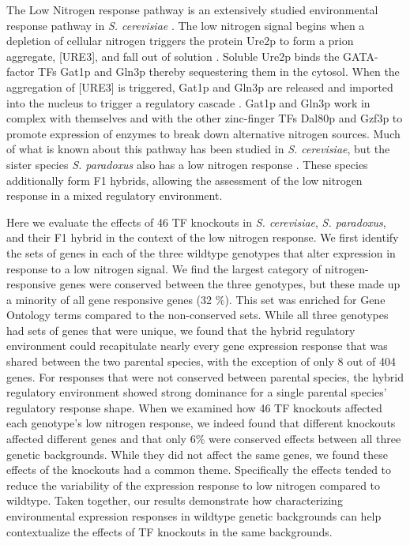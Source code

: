 The Low Nitrogen response pathway is an extensively studied environmental response pathway in \textit{S. cerevisiae} \cite{Magasanik2005}. The low nitrogen signal begins when a depletion of cellular nitrogen triggers the protein Ure2p to form a prion aggregate, [URE3], and fall out of solution \cite{Wickner1994}. Soluble Ure2p binds the GATA-factor TFs Gat1p and Gln3p thereby sequestering them in the cytosol. When the aggregation of [URE3] is triggered, Gat1p and Gln3p are released and imported into the nucleus to trigger a regulatory cascade \cite{Zhang2018}. Gat1p and Gln3p work in complex with themselves and with the other zinc-finger TFs Dal80p and Gzf3p to promote expression of enzymes to break down alternative nitrogen sources. Much of what is known about this pathway has been studied in \textit{S. cerevisiae}, but the sister species \textit{S. paradoxus} also has a low nitrogen response \cite{Orlic2010}. These species additionally form F1 hybrids, allowing the assessment of the low nitrogen response in a mixed regulatory environment. 

Here we evaluate the effects of 46 TF knockouts in \textit{S. cerevisiae}, \textit{S. paradoxus}, and their F1 hybrid in the context of the low nitrogen response. We first identify the sets of genes in each of the three wildtype genotypes that alter expression in response to a low nitrogen signal. We find the largest category of nitrogen-responsive genes were conserved between the three genotypes, but these made up a minority of all gene responsive genes (32 \%). This set was enriched for Gene Ontology terms compared to the non-conserved sets. While all three genotypes had sets of genes that were unique, we found that the hybrid regulatory environment could recapitulate nearly every gene expression response that was shared between the two parental species, with the exception of only 8 out of 404 genes. For responses that were not conserved between parental species, the hybrid regulatory environment showed strong dominance for a single parental species' regulatory response shape. When we examined how 46 TF knockouts affected each genotype's low nitrogen response, we indeed found that different knockouts affected different genes and that only 6\% were conserved effects between all three genetic backgrounds. While they did not affect the same genes, we found these effects of the knockouts had a common theme. Specifically the effects tended to reduce the variability of the expression response to low nitrogen compared to wildtype. Taken together, our results demonstrate how characterizing environmental expression responses in wildtype genetic backgrounds can help contextualize the effects of TF knockouts in the same backgrounds.

